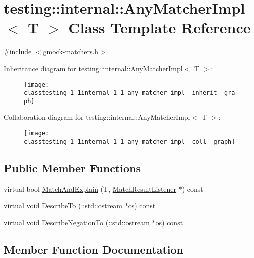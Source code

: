 \hypertarget{classtesting_1_1internal_1_1_any_matcher_impl}{}\section{testing\+:\+:internal\+:\+:Any\+Matcher\+Impl$<$ T $>$ Class Template Reference}
\label{classtesting_1_1internal_1_1_any_matcher_impl}


{\ttfamily \#include $<$gmock-\/matchers.\+h$>$}



Inheritance diagram for testing\+:\+:internal\+:\+:Any\+Matcher\+Impl$<$ T $>$\+:
\nopagebreak
\begin{figure}[H]
\begin{center}
\leavevmode
\texttt{[image: classtesting\_1\_1internal\_1\_1\_any\_matcher\_impl\_\_inherit\_\_graph]}
\end{center}
\end{figure}


Collaboration diagram for testing\+:\+:internal\+:\+:Any\+Matcher\+Impl$<$ T $>$\+:
\nopagebreak
\begin{figure}[H]
\begin{center}
\leavevmode
\texttt{[image: classtesting\_1\_1internal\_1\_1\_any\_matcher\_impl\_\_coll\_\_graph]}
\end{center}
\end{figure}
\subsection*{Public Member Functions}
\begin{DoxyCompactItemize}
\item 
virtual bool \hyperlink{classtesting_1_1internal_1_1_any_matcher_impl_a03fe8956cfe9827b0ceacbd130fb88c1}{Match\+And\+Explain} (T, \hyperlink{classtesting_1_1_match_result_listener}{Match\+Result\+Listener} $\ast$) const 
\item 
virtual void \hyperlink{classtesting_1_1internal_1_1_any_matcher_impl_ae68a082e0c85a0b6f3502698e60333a8}{Describe\+To} (\+::std\+::ostream $\ast$os) const 
\item 
virtual void \hyperlink{classtesting_1_1internal_1_1_any_matcher_impl_ae403b0e2cf75db076e3465c579a2175b}{Describe\+Negation\+To} (\+::std\+::ostream $\ast$os) const 
\end{DoxyCompactItemize}


\subsection{Member Function Documentation}
